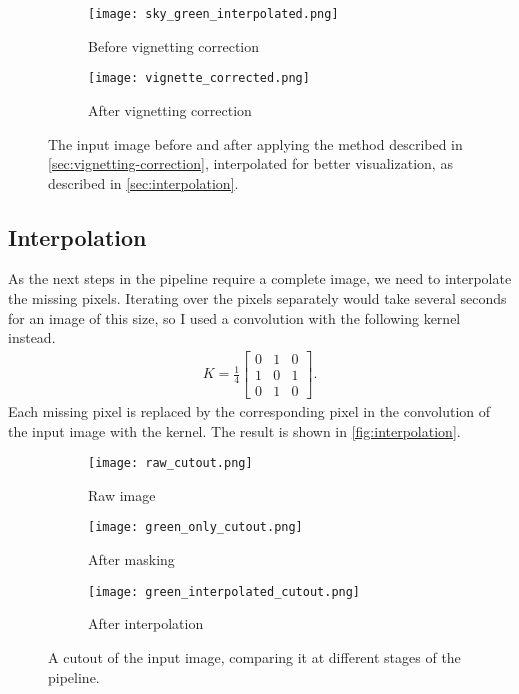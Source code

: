\begin{figure}[htbp]
  \centering
  \begin{subfigure}{.49\textwidth}
    \centering
    \texttt{[image: sky\_green\_interpolated.png]}
    \caption{Before vignetting correction}
  \end{subfigure}%
  \hfill
  \begin{subfigure}{.49\textwidth}
    \centering
    \texttt{[image: vignette\_corrected.png]}
    \caption{After vignetting correction}
  \end{subfigure}
  \caption{The input image before and after applying the method described in
    \autoref{sec:vignetting-correction}, interpolated for better visualization, as
    described in \autoref{sec:interpolation}.}
  \label{fig:vignette-correction}
\end{figure}

\subsection{Interpolation}
\label{sec:interpolation}

As the next steps in the pipeline require a complete image, we need to interpolate the
missing pixels. Iterating over the pixels separately would take several seconds for an
image of this size, so I used a convolution with the following kernel instead.
\begin{align*}
  K = \frac{1}{4} \begin{bmatrix}
                    0 & 1 & 0 \\
                    1 & 0 & 1 \\
                    0 & 1 & 0
                  \end{bmatrix}.
\end{align*}
Each missing pixel is replaced by the corresponding pixel in the convolution of the input
image with the kernel. The result is shown in \autoref{fig:interpolation}.

\begin{figure}[tb]
  \centering
  \begin{subfigure}{.33\textwidth}
    \centering
    \texttt{[image: raw\_cutout.png]}
    \caption{Raw image}
  \end{subfigure}%
  \hfill
  \begin{subfigure}{.33\textwidth}
    \centering
    \texttt{[image: green\_only\_cutout.png]}
    \caption{After masking}
  \end{subfigure}%
  \hfill
  \begin{subfigure}{.33\textwidth}
    \centering
    \texttt{[image: green\_interpolated\_cutout.png]}
    \caption{After interpolation}
  \end{subfigure}
  \caption{A cutout of the input image, comparing it at different stages of the pipeline.}
  \label{fig:interpolation}
\end{figure}



